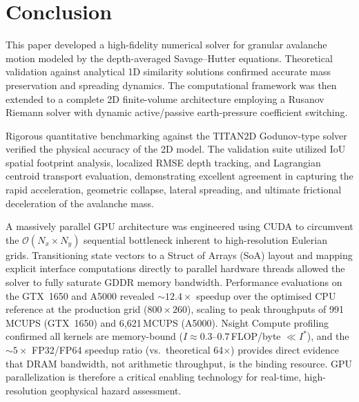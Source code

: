 \documentclass[10pt, conference]{FMFP2023}
\begin{document}
\section{Conclusion}

This paper developed a high-fidelity numerical solver for granular
avalanche motion modeled by the depth-averaged Savage--Hutter
equations.
Theoretical validation against analytical 1D similarity solutions
confirmed accurate mass preservation and spreading dynamics.
The computational framework was then extended to a complete 2D
finite-volume architecture employing a Rusanov Riemann solver with
dynamic active/passive earth-pressure coefficient switching.

Rigorous quantitative benchmarking against the TITAN2D Godunov-type
solver verified the physical accuracy of the 2D model.
The validation suite utilized IoU spatial footprint analysis,
localized RMSE depth tracking, and Lagrangian centroid transport
evaluation, demonstrating excellent agreement in capturing the rapid
acceleration, geometric collapse, lateral spreading, and ultimate
frictional deceleration of the avalanche mass.

A massively parallel GPU architecture was engineered using CUDA to
circumvent the $\mathcal{O}(N_x\times N_y)$ sequential bottleneck
inherent to high-resolution Eulerian grids.
Transitioning state vectors to a Struct of Arrays (SoA) layout and
mapping explicit interface computations directly to parallel hardware
threads allowed the solver to fully saturate GDDR memory bandwidth.
Performance evaluations on the GTX~1650 and A5000 revealed
$\sim12.4\times$ speedup over the optimised CPU reference at the
production grid ($800\times260$), scaling to peak throughputs of
991\,MCUPS (GTX~1650) and 6{,}621\,MCUPS (A5000).
Nsight Compute profiling confirmed all kernels are memory-bound
($I\approx0.3$--$0.7$\,FLOP/byte $\ll I^*$), and the $\sim5\times$
FP32/FP64 speedup ratio (vs.\ theoretical 64$\times$) provides
direct evidence that DRAM bandwidth, not arithmetic throughput,
is the binding resource.
GPU parallelization is therefore a critical enabling technology for
real-time, high-resolution geophysical hazard assessment.
\end{document}
